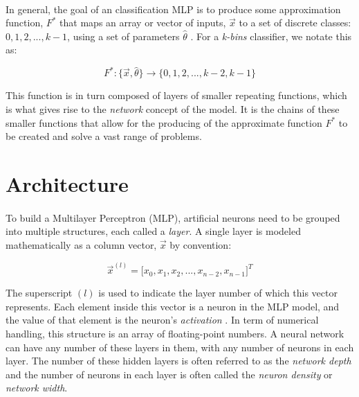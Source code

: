 \documentclass[12pt,letterpaper]{article}
\begin{document}
\paragraph*{}In general, the goal of an classification MLP is to produce some approximation function, $F^*$ that maps an array or vector of inputs, 
$\vec{x}$ to a set of discrete classes: $0,1,2,...,k-1$, using a set of parameters $\hat{\theta}$ \cite{Geron,Goodfellow,Petrik}. For a \textit{k-bins} classifier, we notate this as:

\begin{equation}
\label{approx}
F^* : \big\{ \vec{x},\hat{\theta}\big\} \rightarrow \big\{ 0,1,2,...,k-2,k-1 \big\}
\end{equation}

This function is in turn composed of layers of smaller repeating functions, which is what gives rise to the \textit{network} concept of the model. It is the chains of these smaller functions that allow for the producing of the approximate function $F^*$ to be created and solve a vast range of problems.



\section*{Architecture}
\paragraph*{}To build a Multilayer Perceptron (MLP), artificial neurons need to be grouped into multiple structures, each called a \textit{layer}. A single layer is modeled mathematically as a column vector, $\vec{x}$ by convention:

\begin{equation}
\label{layer}
\vec{x}^{(l)} = \big[ x_0 , x_1 , x_2 , ... , x_{n-2} , x_{n-1} \big]^T
\end{equation}

The superscript $(l)$ is used to indicate the layer number of which this vector represents. Each element inside this vector is a neuron in the MLP model, and the value of that element is the neuron's \textit{activation} \cite{Geron}. In term of numerical handling, this structure is an array of floating-point numbers. A neural network can have any number of these layers in them, with any number of neurons in each layer. The number of these hidden layers is often referred to as the \textit{network depth} and the number of neurons in each layer is often called the \textit{neuron density} or \textit{network width}.
\end{document}
